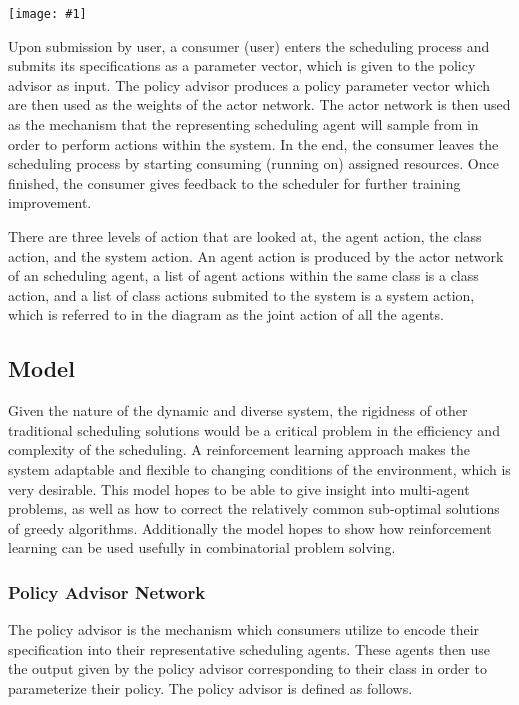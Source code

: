\documentclass{article}
\theoremstyle{definition}
\theoremstyle{remark}
\newcommand{\addpic}[1]{\texttt{[image: \#1]}}
\begin{document}
		\addpic{figures/general_diagram.png}
	
		Upon submission by user, a consumer (user) enters the scheduling process and submits its specifications as a parameter vector, which is given to the policy advisor as input. The policy advisor produces a policy parameter vector which are then used as the weights of the actor network. The actor network is then used as the mechanism that the representing scheduling agent will sample from in order to perform actions within the system. In the end, the consumer leaves the scheduling process by starting consuming (running on) assigned resources. Once finished, the consumer gives feedback to the scheduler for further training improvement.

		There are three levels of action that are looked at, the agent action, the class action, and the system action. An agent action is produced by the actor network of an scheduling agent, a list of agent actions within the same class is a class action, and a list of class actions submited to the system is a system action, which is referred to in the diagram as the joint action of all the agents.		

		\subsection{Model}
		
		Given the nature of the dynamic and diverse system, the rigidness of other traditional scheduling solutions would be a critical problem in the efficiency and complexity of the scheduling. A reinforcement learning approach makes the system adaptable and flexible to changing conditions of the environment, which is very desirable. This model hopes to be able to give insight into multi-agent problems, as well as how to correct the relatively common sub-optimal solutions of greedy algorithms. Additionally the model hopes to show how reinforcement learning can be used usefully in combinatorial problem solving.
		
			\subsubsection{Policy Advisor Network}
	
			The policy advisor is the mechanism which consumers utilize to encode their specification into their representative scheduling agents. These agents then use the output given by the policy advisor corresponding to their class in order to parameterize their policy. The policy advisor is defined as follows.
		
\end{document}
